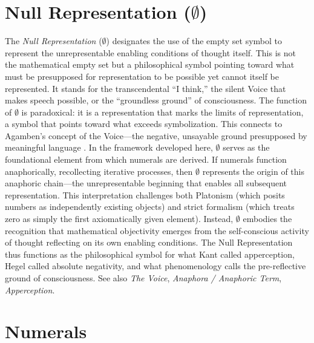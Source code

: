 \documentclass{book}
\begin{document}
\section{Null Representation ($\emptyset$)}

The \textit{Null Representation} ($\emptyset$) designates the use of the empty set symbol to represent the unrepresentable enabling conditions of thought itself. This is not the mathematical empty set but a philosophical symbol pointing toward what must be presupposed for representation to be possible yet cannot itself be represented. It stands for the transcendental ``I think,'' the silent Voice that makes speech possible, or the ``groundless ground'' of consciousness. The function of $\emptyset$ is paradoxical: it is a representation that marks the limits of representation, a symbol that points toward what exceeds symbolization. This connects to Agamben's concept of the Voice---the negative, unsayable ground presupposed by meaningful language \parencite{agamben_language_2006}. In the framework developed here, $\emptyset$ serves as the foundational element from which numerals are derived. If numerals function anaphorically, recollecting iterative processes, then $\emptyset$ represents the origin of this anaphoric chain---the unrepresentable beginning that enables all subsequent representation. This interpretation challenges both Platonism (which posits numbers as independently existing objects) and strict formalism (which treats zero as simply the first axiomatically given element). Instead, $\emptyset$ embodies the recognition that mathematical objectivity emerges from the self-conscious activity of thought reflecting on its own enabling conditions. The Null Representation thus functions as the philosophical symbol for what Kant called apperception, Hegel called absolute negativity, and what phenomenology calls the pre-reflective ground of consciousness. See also \textit{The Voice}, \textit{Anaphora / Anaphoric Term}, \textit{Apperception}.

\section{Numerals}
\end{document}
